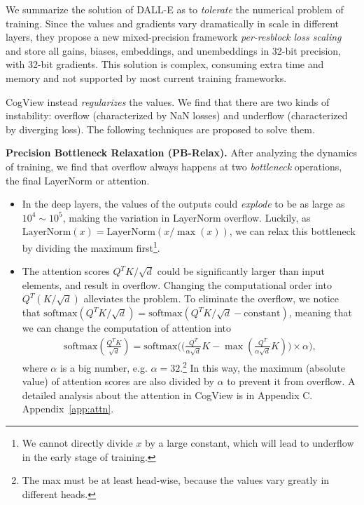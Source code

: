 We summarize the solution of DALL-E as to \emph{tolerate} the numerical problem of training. Since the values and gradients vary dramatically in scale in different layers, they propose a new mixed-precision framework \emph{per-resblock loss scaling} and store all gains, biases, embeddings, and unembeddings in 32-bit precision, with 32-bit gradients. This solution is complex, consuming extra time and memory and not supported by most current training frameworks. 

CogView instead \emph{regularizes} the values. We find that there are two kinds of instability: overflow (characterized by NaN losses) and underflow (characterized by diverging loss). The following techniques are proposed to solve them. 

\textbf{Precision Bottleneck Relaxation (PB-Relax).} After analyzing the dynamics of training, we find that overflow always happens at two \emph{bottleneck} operations, the final LayerNorm or attention.

\begin{itemize}
  \item In the deep layers, the values of the outputs could \emph{explode} to be as large as $10^4\sim10^5$, making the variation in LayerNorm overflow. Luckily, as $\text{LayerNorm}(x) = \text{LayerNorm}(x / \max(x))$, we can relax this bottleneck by dividing the maximum first\footnote{We cannot directly divide $x$ by a large constant, which will lead to underflow in the early stage of training.}.
  \item The attention scores $Q^TK/\sqrt{d}$ could be significantly larger than input elements, and result in overflow. Changing the computational order into $Q^T(K/\sqrt{d})$ alleviates the problem. To eliminate the overflow, we notice that $\text{softmax}(Q^TK/\sqrt{d}) = \text{softmax}(Q^TK/\sqrt{d} - \text{constant})$, meaning that we can change the computation of attention into 
\begin{align}
  \text{softmax}(\frac{Q^TK}{\sqrt{d}})

  =\text{softmax}\bigg(\big(\frac{Q^T}{\alpha\sqrt{d}}K - \max(\frac{Q^T}{\alpha\sqrt{d}}K)\big)\times \alpha\bigg),
\end{align}
where $\alpha$ is a big number, e.g. 
$\alpha=32$.\footnote{The max must be at least head-wise, because the values vary greatly in different heads.} In this way, the maximum (absolute value) of attention scores are also divided by $\alpha$ to prevent it from overflow. A detailed analysis about the attention in CogView is in \ifblind Appendix C. \else Appendix~\ref{app:attn}.\fi
\end{itemize}


